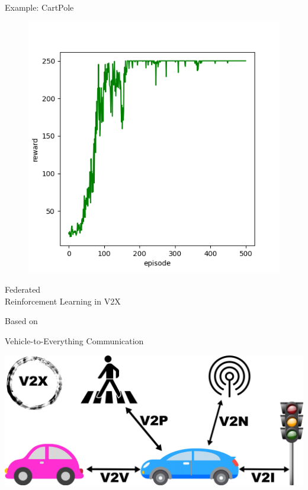 \documentclass[aspectratio=169,12pt]{beamer}
\begin{document}
\begin{frame}{Example: CartPole}
\begin{figure}
{}
    \includegraphics[width=0.35\linewidth]{images/CartPole10.png}
    \label{fig:enter-label}
  \end{figure}

\end{frame}




\begin{frame}
  \begin{center}
    \textcolor{beamer@blendedblue}{
      \huge Federated \\[1em]
      \huge Reinforcement Learning in V2X
    }
  \end{center}

  \vspace{2em}

  Based on 
\end{frame}

\begin{frame}{Vehicle-to-Everything Communication}
  \begin{center}
    \includegraphics[width=0.7\linewidth]{images/Types_V2X.png}
  \end{center}
  
\end{frame}
\end{document}
